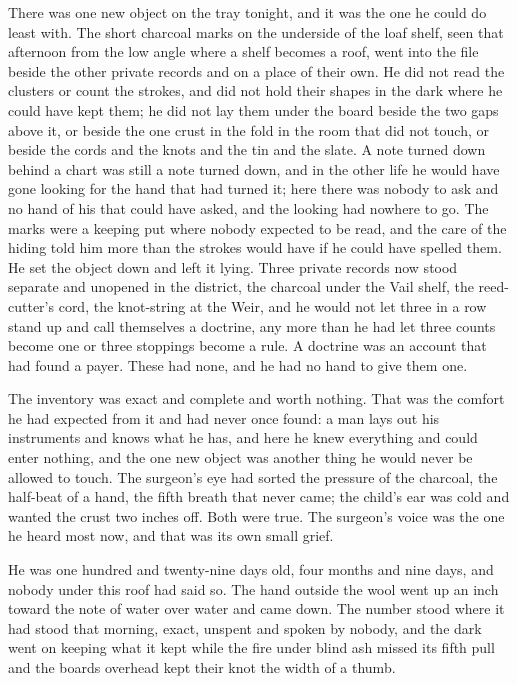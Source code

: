 There was one new object on the tray tonight, and it was the one he could do least with. The short charcoal marks on the underside of the loaf shelf, seen that afternoon from the low angle where a shelf becomes a roof, went into the file beside the other private records and on a place of their own. He did not read the clusters or count the strokes, and did not hold their shapes in the dark where he could have kept them; he did not lay them under the board beside the two gaps above it, or beside the one crust in the fold in the room that did not touch, or beside the cords and the knots and the tin and the slate. A note turned down behind a chart was still a note turned down, and in the other life he would have gone looking for the hand that had turned it; here there was nobody to ask and no hand of his that could have asked, and the looking had nowhere to go. The marks were a keeping put where nobody expected to be read, and the care of the hiding told him more than the strokes would have if he could have spelled them. He set the object down and left it lying. Three private records now stood separate and unopened in the district, the charcoal under the Vail shelf, the reed-cutter's cord, the knot-string at the Weir, and he would not let three in a row stand up and call themselves a doctrine, any more than he had let three counts become one or three stoppings become a rule. A doctrine was an account that had found a payer. These had none, and he had no hand to give them one.

The inventory was exact and complete and worth nothing. That was the comfort he had expected from it and had never once found: a man lays out his instruments and knows what he has, and here he knew everything and could enter nothing, and the one new object was another thing he would never be allowed to touch. The surgeon's eye had sorted the pressure of the charcoal, the half-beat of a hand, the fifth breath that never came; the child's ear was cold and wanted the crust two inches off. Both were true. The surgeon's voice was the one he heard most now, and that was its own small grief.

He was one hundred and twenty-nine days old, four months and nine days, and nobody under this roof had said so. The hand outside the wool went up an inch toward the note of water over water and came down. The number stood where it had stood that morning, exact, unspent and spoken by nobody, and the dark went on keeping what it kept while the fire under blind ash missed its fifth pull and the boards overhead kept their knot the width of a thumb.
